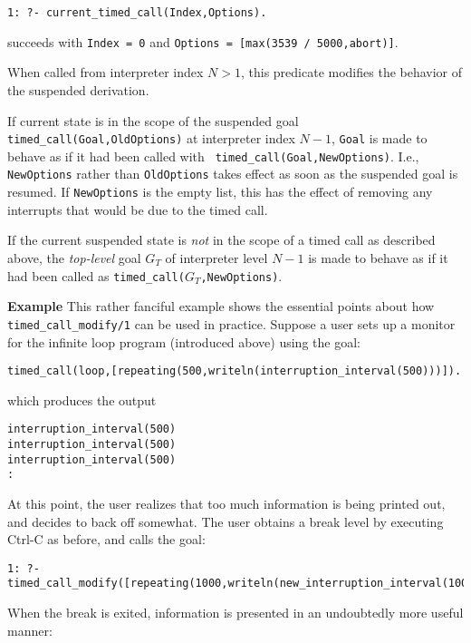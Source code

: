 \begin{description}
{\tt 1: ?- current\_timed\_call(Index,Options).} 

succeeds with {\tt Index = 0} and {\tt Options = [max(3539 / 5000,abort)]}.

%
When called from interpreter index $N>1$, this predicate modifies the
behavior of the suspended derivation.  
%
\bi
\item If current state is in the scope of the suspended goal {\tt
  timed\_call(Goal,OldOptions)} at interpreter index $N-1$, {\tt Goal}
  is made to behave as if it had been called with {\tt
    timed\_call(Goal,NewOptions)}.  I.e., {\tt NewOptions} rather than
  {\tt OldOptions} takes effect as soon as the suspended goal is
  resumed.  If {\tt NewOptions} is the empty list, this has the effect
  of removing any interrupts that would be due to the timed call.
%
\item If the current suspended state is {\em not} in the scope of a
  timed call as described above, the {\em top-level} goal $G_T$ of
  interpreter level $N-1$ is made to behave as if it had been called
  as {\tt timed\_call($G_T$,NewOptions)}.
\ei

{\bf Example} 
%
This rather fanciful example shows the essential points about how {\tt
  timed\_call\_modify/1} can be used in practice.  Suppose a user sets
up a monitor for the infinite loop program (introduced above) using
the goal:

{\tt timed\_call(loop,[repeating(500,writeln(interruption\_interval(500)))]).}

which produces the output 

\begin{verbatim}
interruption_interval(500)
interruption_interval(500)
interruption_interval(500)
:
\end{verbatim}
%
At this point, the user realizes that too much information is being
printed out, and decides to back off somewhat.  The user obtains a
break level by executing Ctrl-C as before, and calls the goal: 

{\small
\begin{verbatim}
1: ?- timed_call_modify([repeating(1000,writeln(new_interruption_interval(1000)))]).
\end{verbatim}
}

When the break is exited, information is presented in an undoubtedly
more useful manner:


\end{description}
